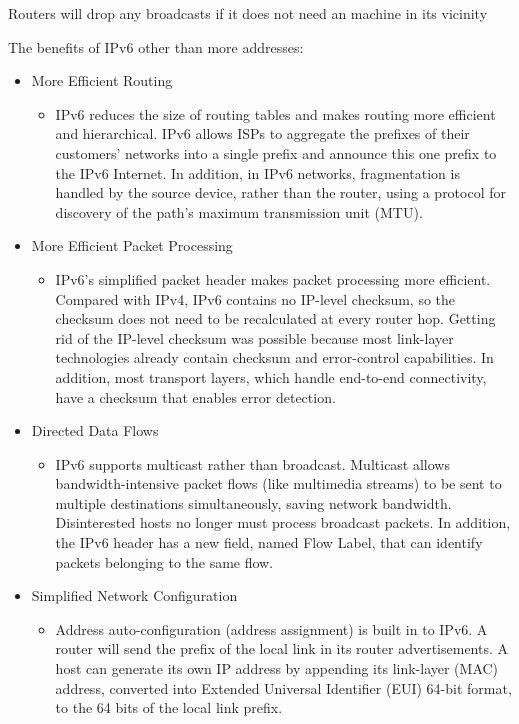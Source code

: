 \documentclass[fancy,11pt,titlestyle=display]{style/elegantbook}
\begin{document}
Routers will drop any broadcasts if it does not need an machine in its vicinity



The benefits of IPv6 other than more addresses:
\begin{itemize}
    \item More Efficient Routing
    \begin{itemize}
       \item IPv6 reduces the size of routing tables and makes routing more efficient and hierarchical. IPv6 allows ISPs to aggregate the prefixes of their customers' networks into a single prefix and announce this one prefix to the IPv6 Internet. In addition, in IPv6 networks, fragmentation is handled by the source device, rather than the router, using a protocol for discovery of the path's maximum transmission unit (MTU).
    \end{itemize}
    \item More Efficient Packet Processing
    \begin{itemize}
        \item IPv6's simplified packet header makes packet processing more efficient. Compared with IPv4, IPv6 contains no IP-level checksum, so the checksum does not need to be recalculated at every router hop. Getting rid of the IP-level checksum was possible because most link-layer technologies already contain checksum and error-control capabilities. In addition, most transport layers, which handle end-to-end connectivity, have a checksum that enables error detection.
    \end{itemize}
    \item Directed Data Flows

    \begin{itemize}
        \item IPv6 supports multicast rather than broadcast. Multicast allows bandwidth-intensive packet flows (like multimedia streams) to be sent to multiple destinations simultaneously, saving network bandwidth. Disinterested hosts no longer must process broadcast packets. In addition, the IPv6 header has a new field, named Flow Label, that can identify packets belonging to the same flow.
    \end{itemize}
    \item Simplified Network Configuration


    \begin{itemize}
        \item Address auto-configuration (address assignment) is built in to IPv6. A router will send the prefix of the local link in its router advertisements. A host can generate its own IP address by appending its link-layer (MAC) address, converted into Extended Universal Identifier (EUI) 64-bit format, to the 64 bits of the local link prefix.
    \end{itemize}



\end{itemize}
\end{document}
